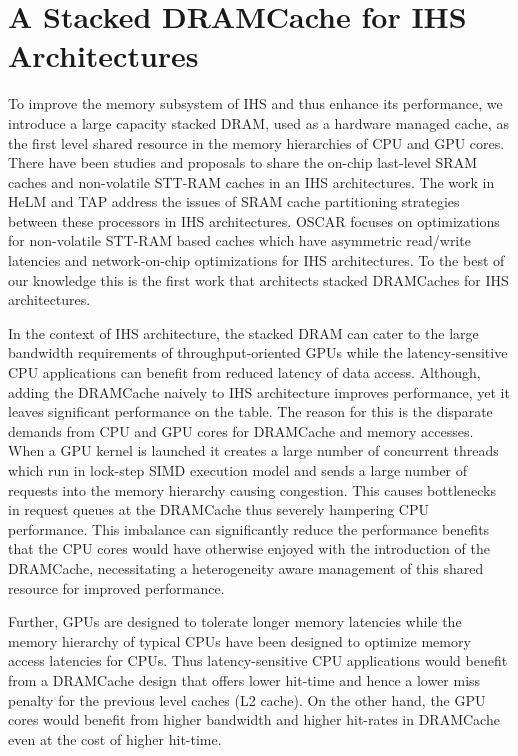 \section{A Stacked DRAMCache for IHS Architectures}
To improve the memory subsystem of IHS and thus enhance its performance, we introduce a large capacity stacked DRAM, used as a hardware managed cache, as the  first level shared resource in the memory hierarchies of CPU and GPU cores. There have been studies and proposals to share the on-chip last-level SRAM caches \cite{helm,tap} and non-volatile STT-RAM caches \cite{oscar} in an IHS architectures. The work in HeLM \cite{helm} and TAP \cite{tap} address the issues of SRAM cache partitioning strategies between these processors in IHS architectures. OSCAR \cite{oscar} focuses on optimizations for non-volatile STT-RAM based caches which have asymmetric read/write latencies and network-on-chip optimizations for IHS architectures. To the best of our knowledge this is the first work that architects stacked DRAMCaches for IHS architectures.
\par In the context of IHS architecture, the stacked DRAM can cater to the large bandwidth requirements of throughput-oriented GPUs while the latency-sensitive CPU applications can benefit from reduced latency of data access. Although, adding the DRAMCache naively to IHS architecture improves performance, yet it leaves significant performance on the table.  The reason for this is the  disparate demands from CPU and GPU cores for DRAMCache and memory accesses. When a GPU kernel is launched it creates a large number of concurrent threads which run in lock-step SIMD execution model and sends a large number of requests into the memory hierarchy causing congestion. This causes bottlenecks in request queues at the DRAMCache thus severely hampering CPU performance. This imbalance can significantly reduce the performance benefits that the CPU cores would have otherwise enjoyed with the introduction of the DRAMCache, necessitating a heterogeneity aware management of this shared resource for improved performance. 
\par Further, GPUs are designed to tolerate longer memory latencies while the memory hierarchy of typical CPUs have been designed to optimize memory access latencies for CPUs. Thus latency-sensitive CPU applications would benefit from a DRAMCache design that offers lower hit-time and hence a lower miss penalty for the previous level caches (L2 cache). On the other hand, the GPU cores would benefit from higher bandwidth and higher hit-rates in DRAMCache even at the cost of higher hit-time.
